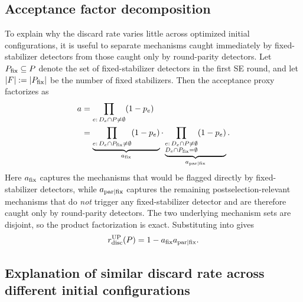 \subsection{Acceptance factor decomposition}

To explain why the discard rate varies little across optimized initial configurations, it is useful to separate mechanisms caught immediately by fixed-stabilizer detectors from those caught only by round-parity detectors.
Let $P_{\rm fix}\subseteq P$ denote the set of fixed-stabilizer detectors in the first SE round, and let $|F|:=|P_{\rm fix}|$ be the number of fixed stabilizers.
Then the acceptance proxy factorizes as
\begin{align}
a
&= \prod_{e:\,D_e\cap P\neq \emptyset}(1-p_e) \\
&=
\underbrace{\prod_{e:\,D_e\cap P_{\rm fix}\neq \emptyset}(1-p_e)}_{a_{\rm fix}}
\cdot
\underbrace{\prod_{\substack{e:\,D_e\cap P\neq \emptyset\\ D_e\cap P_{\rm fix}=\emptyset}}(1-p_e)}_{a_{{\rm par}\mid{\rm fix}}}.
\label{eq:acceptance_decomp}
\end{align}
Here $a_{\rm fix}$ captures the mechanisms that would be flagged directly by fixed-stabilizer detectors, while $a_{{\rm par}\mid{\rm fix}}$ captures the remaining postselection-relevant mechanisms that do \emph{not} trigger any fixed-stabilizer detector and are therefore caught only by round-parity detectors.
The two underlying mechanism sets are disjoint, so the product factorization is exact.
Substituting  into  gives
\begin{equation}
r_{\rm disc}^{\rm UP}(P)
=
1-a_{\rm fix}a_{{\rm par}\mid{\rm fix}}.
\label{eq:rdisc_up_factored}
\end{equation}

\subsection{Explanation of similar discard rate across different initial configurations}
\label{sec:explanation-similar-discard-rate}

